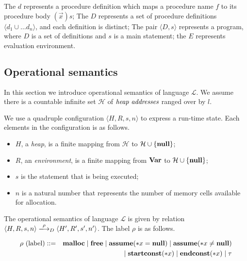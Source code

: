 The \(d\) represents a procedure definition which maps a procedure
name \(f\) to its procedure body \((\vec{x})s\); The \(D\) represents
a set of procedure definitions \(\langle d_1 \cup\dots d_n \rangle\),
and each definition is distinct; The pair \(\langle D, s \rangle \)
represents a program, where \(D\) is a set of definitions and \(s\) is
a main statement; the \(E\) represents evaluation environment.

\subsection{Operational semantics}
\label{sec:languageSemantics}
In this section we introduce operational semantics of language
\(\mathcal{L}\). We assume there is a countable infinite set
\(\mathcal{H}\) of \(\emph{heap addresses}\) ranged over by \(l\).

We use a quadruple configuration \(\langle H, R, s, n \rangle\) to
express a run-time state. Each elements in the configuration is as
follows.

\begin{itemize}
\item \(H\), a \emph{heap}, is a finite mapping from \(\mathcal{H}\)
  to \(\mathcal{H} \cup \{\mathbf{null}\}\);
\item \(R\), an \emph{environment}, is a finite mapping from \(\mathbf{Var}\)
  to \(\mathcal{H} \cup \{\mathbf{null}\}\);
\item \(s\) is the statement that is being executed; 
\item \(n\) is a natural number that represents the number of memory
  cells available for allocation.
\end{itemize}

The operational semantics of language \(\mathcal{L}\) is given by
relation \(\langle H, R, s, n \rangle \xlongrightarrow{\rho}_D
\langle H', R', s', n' \rangle\). The label \(\rho\) is as follows.

\begin{eqnarray*}
 \rho \mbox{ (label)} &::=& \mathbf{malloc} \mid \mathbf{free} \mid \mathbf{assume}(*x = \mathbf{null}) \mid \mathbf{assume}(*x \ne \mathbf{null})  \\
 &&\mid \mathbf{startconst}(*x) \mid \mathbf{endconst}(*x) \mid \tau  \\
\end{eqnarray*}

